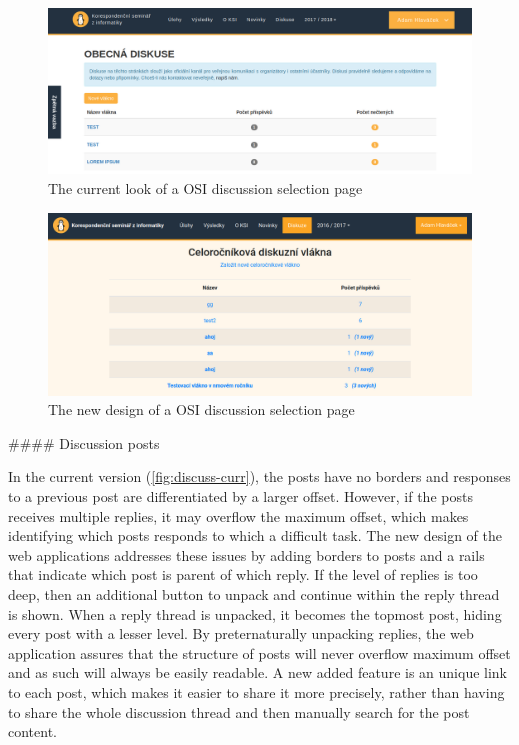 \documentclass[
  digital, %
  oneside, %
  lof,     %
  lot,     %
]{fithesis4}
\begin{document}
{\begin{figure}
\includegraphics[width=\textwidth]{assets/img/discussionroot-curr}
\caption{The current look of a OSI discussion selection page}
\label{fig:discussroot-curr}
\end{figure}

\begin{figure}
\includegraphics[width=\textwidth]{assets/img/discussionroot-new}
\caption{The new design of a OSI discussion selection page}
\label{fig:discussroot-new}
\end{figure}

#### Discussion posts

In the current version (\ref{fig:discuss-curr}), the posts have no borders and responses to a previous post are differentiated by a larger offset. However, if the posts receives multiple replies, it may overflow the maximum offset, which makes identifying which posts responds to which a difficult task. The new design of the web applications addresses these issues by adding borders to posts and a rails that indicate which post is parent of which reply. If the level of replies is too deep, then an additional button to unpack and continue within the reply thread is shown. When a reply thread is unpacked, it becomes the topmost post, hiding every post with a lesser level. By preternaturally unpacking replies, the web application assures that the structure of posts will never overflow maximum offset and as such will always be easily readable. A new added feature is an unique link to each post, which makes it easier to share it more precisely, rather than having to share the whole discussion thread and then manually search for the post content.

}
\end{document}
